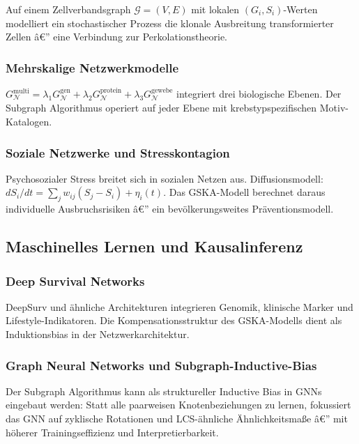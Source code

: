 ﻿\documentclass[12pt, a4paper]{article}
\theoremstyle{definition}
\theoremstyle{remark}
\newcommand{\calG}{\mathcal{G}}
\newcommand{\calN}{\mathcal{N}}
\newcommand{\GN}{G_{\calN}}
\begin{document}
Auf einem Zellverbandsgraph $\calG = (V, E)$ mit lokalen $(G_i, S_i)$-Werten
modelliert ein stochastischer Prozess die klonale Ausbreitung transformierter Zellen â€”
eine Verbindung zur Perkolationstheorie.

\subsubsection{Mehrskalige Netzwerkmodelle}

$\GN^{\mathrm{multi}} = \lambda_1 G^\mathrm{gen}_\calN + \lambda_2 G^\mathrm{protein}_\calN
+ \lambda_3 G^\mathrm{gewebe}_\calN$ integriert drei biologische Ebenen.
Der Subgraph Algorithmus operiert auf jeder Ebene mit krebstypspezifischen
Motiv-Katalogen.

\subsubsection{Soziale Netzwerke und Stresskontagion}

Psychosozialer Stress breitet sich in sozialen Netzen aus. Diffusionsmodell:
$dS_i/dt = \sum_j w_{ij}(S_j - S_i) + \eta_i(t)$. Das GSKA-Modell berechnet
daraus individuelle Ausbruchsrisiken â€” ein bevölkerungsweites Präventionsmodell.

\subsection{Maschinelles Lernen und Kausalinferenz}

\subsubsection{Deep Survival Networks}

DeepSurv und ähnliche Architekturen integrieren Genomik, klinische Marker und
Lifestyle-Indikatoren. Die Kompensationsstruktur des GSKA-Modells dient als
Induktionsbias in der Netzwerkarchitektur.

\subsubsection{Graph Neural Networks und Subgraph-Inductive-Bias}

Der Subgraph Algorithmus kann als struktureller Inductive Bias in GNNs eingebaut
werden: Statt alle paarweisen Knotenbeziehungen zu lernen, fokussiert das GNN auf
zyklische Rotationen und LCS-ähnliche Ähnlichkeitsmaße â€” mit höherer
Trainingseffizienz und Interpretierbarkeit.
\end{document}
